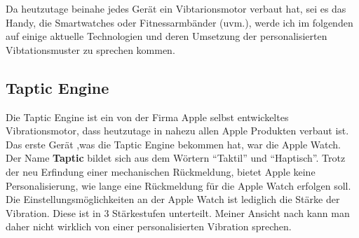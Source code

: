 
Da heutzutage beinahe jedes Ger{\"a}t ein Vibtarionsmotor verbaut hat, sei es das Handy, die Smartwatches oder Fitnessarmb{\"a}nder (uvm.), werde ich im folgenden auf einige aktuelle Technologien und deren Umsetzung der personalisierten Vibtationsmuster zu sprechen kommen. 

\subsection{Taptic Engine}
\label{ch:Grundlagen:sec:RelatedWork:subsec:TapticEngine}

Die Taptic Engine ist ein von der Firma Apple selbst entwickeltes Vibrationsmotor, dass heutzutage in nahezu allen Apple Produkten verbaut ist. Das erste Ger{\"a}t ,was die Taptic Engine bekommen hat, war die Apple Watch. Der Name \textbf{Taptic} bildet sich aus dem W{\"o}rtern "`Taktil"' und "`Haptisch"'. 
Trotz der neu Erfindung einer mechanischen R{\"u}ckmeldung, bietet Apple keine Personalisierung, wie lange eine R{\"u}ckmeldung f{\"u}r die Apple Watch erfolgen soll. Die Einstellungsm{\"o}glichkeiten an der Apple Watch ist lediglich die St{\"a}rke der Vibration. Diese ist in 3 St{\"a}rkestufen unterteilt. Meiner Ansicht nach kann man daher nicht wirklich von einer personalisierten Vibration sprechen. 

